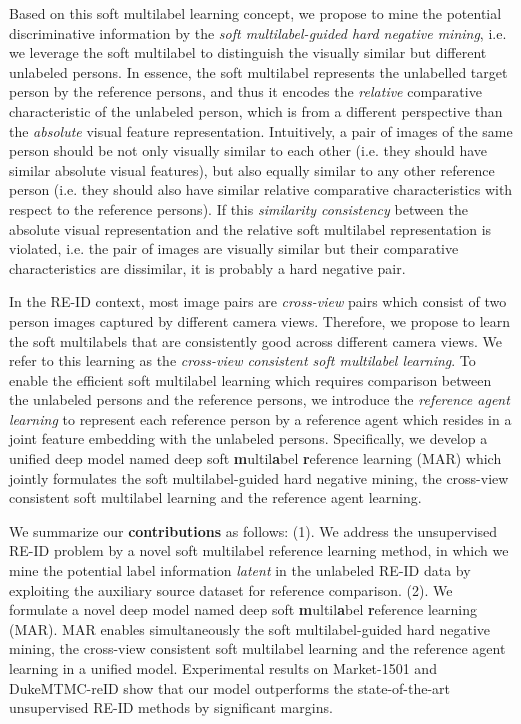 \documentclass[10pt,twocolumn,letterpaper]{article}
\newcommand{\Koven}{\color{black}}
\begin{document}
Based on this soft multilabel learning concept,
we propose to mine the potential discriminative information by the \emph{soft multilabel-guided hard negative mining},
i.e. we leverage the soft multilabel to distinguish the visually similar but different unlabeled persons.
In essence, the soft multilabel represents the unlabelled target person by
the reference persons,
and thus it encodes the {\em relative} comparative
characteristic of the unlabeled person,
which is from a different perspective than the {\em absolute} visual feature representation.
Intuitively, a pair of images of the same person should be not only visually similar to each other (i.e. they should have similar absolute visual features),
but also equally similar to any other reference person (i.e. they should also have similar relative comparative characteristics with respect to the reference persons).
If this \emph{similarity consistency} between the absolute visual representation and the relative soft multilabel representation is violated,
i.e. the pair of images are visually similar but their comparative characteristics are dissimilar,
it is probably a hard negative pair.

In the RE-ID context, most image pairs are \emph{cross-view} pairs which consist of two person images captured by different camera views.
Therefore, we propose to learn the soft multilabels that are consistently good across different camera views.
We refer to this learning as the \emph{cross-view consistent soft multilabel learning}.
To enable the efficient soft multilabel learning which requires comparison between the unlabeled persons and the reference persons,
we {\Koven introduce} the \emph{reference agent learning} to represent each reference person
by a reference agent which resides in a joint feature embedding with the unlabeled persons.
Specifically, we {\Koven develop} a unified deep model named deep soft \textbf{m}ultil\textbf{a}bel \textbf{r}eference learning (MAR)
which jointly formulates the soft multilabel-guided hard negative mining, the cross-view consistent soft multilabel learning
and the reference agent learning.

We summarize our \textbf{contributions} as follows:
(1). We address the unsupervised RE-ID problem
by a novel soft multilabel reference learning method,
in which we mine the potential label information {\em latent} in the unlabeled RE-ID data
by exploiting the auxiliary source dataset for reference comparison.
(2). We formulate a novel deep model named deep soft
\textbf{m}ultil\textbf{a}bel \textbf{r}eference learning (MAR).
MAR enables simultaneously the soft multilabel-guided hard negative mining,
the cross-view consistent soft multilabel learning and the reference agent learning in a unified model.
Experimental results on Market-1501 and DukeMTMC-reID show that our model outperforms the
state-of-the-art unsupervised RE-ID methods by significant margins.
\end{document}
